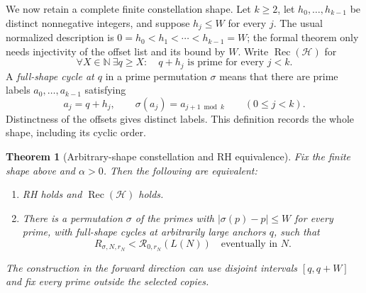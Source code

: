 \documentclass[11pt]{article}
\newtheorem{theorem}{Theorem}[section]
\theoremstyle{definition}
\begin{document}
We now retain a complete finite constellation shape.
Let $k\ge2$, let $h_0,\ldots,h_{k-1}$ be distinct nonnegative integers,
and suppose $h_j\le W$ for every $j$.
The usual normalized description is
$0=h_0<h_1<\cdots<h_{k-1}=W$; the formal theorem only needs
injectivity of the offset list and its bound by $W$.
Write $\operatorname{Rec}(\mathcal H)$ for
\[
 \forall X\in\mathbb N\ \exists q\ge X:
          \quad q+h_j\text{ is prime for every }j<k.
\]
A \emph{full-shape cycle at $q$} in a prime permutation $\sigma$
means that there are prime labels $a_0,\ldots,a_{k-1}$ satisfying
\[
 a_j=q+h_j,\qquad
 \sigma(a_j)=a_{j+1\bmod k}\qquad(0\le j<k).
\]
Distinctness of the offsets gives distinct labels.
This definition records the whole shape, including its cyclic order.

\begin{theorem}[Arbitrary-shape constellation and RH equivalence]
Fix the finite shape above and $\alpha>0$. Then the following are
equivalent:
\begin{enumerate}
\item RH holds and $\operatorname{Rec}(\mathcal H)$ holds.
\item There is a permutation $\sigma$ of the primes with
$|\sigma(p)-p|\le W$ for every prime, with full-shape cycles at
arbitrarily large anchors $q$, such that
\[
 R_{\sigma,N,r_N}<\mathcal R_{0,r_N}(L(N))
                      \quad\text{eventually in }N.
\]
\end{enumerate}
The construction in the forward direction can use disjoint intervals
$[q,q+W]$ and fix every prime outside the selected copies.
\end{theorem}
\end{document}
